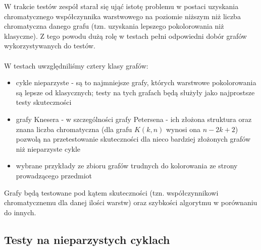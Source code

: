 \documentclass[10pt,a4paper]{article}
\begin{document}
	W trakcie testów zespół starał się ująć istotę problemu w postaci uzyskania chromatycznego współczynnika warstwowego na poziomie niższym niż liczba chromatyczna danego grafu (tzn. uzyskania lepszego pokolorowania niż klasyczne). Z tego powodu dużą rolę w testach pełni odpowiedni dobór grafów wykorzystywanych do testów. 
	\\~\\
	W testach uwzględniliśmy cztery klasy grafów:
	\begin{itemize}
		\item cykle nieparzyste - są to najmniejsze grafy, których warstwowe pokolorowania są lepsze od klasycznych; testy na tych grafach będą służyły jako najprostsze testy skuteczności
		\item grafy Knesera - w szczególności grafy Petersena - ich złożona struktura oraz znana liczba chromatyczna (dla grafu $K(k, n)$ wynosi ona $n - 2k + 2$) pozwolą na przetestowanie skuteczności dla nieco bardziej złożonych grafów niż nieparzyste cykle
		\item wybrane przykłady ze zbioru grafów trudnych do kolorowania ze strony prowadzącego przedmiot \cite{gci}
	\end{itemize}
	Grafy będą testowane pod kątem skuteczności (tzn. współczynnikowi chromatycznemu dla danej ilości warstw) oraz szybkości algorytmu w porównaniu do innych.
	
	\subsection{Testy na nieparzystych cyklach}
	
\end{document}
